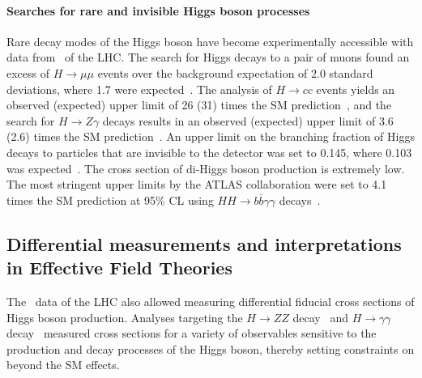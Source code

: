\paragraph{Searches for rare and invisible Higgs boson processes}
Rare decay modes of the Higgs boson have become experimentally accessible with data from \RunTwo\ of the LHC. 
The search for Higgs decays to a pair of muons found an excess of $H \to \mu\mu$ events over the background expectation of 2.0 standard deviations, where 1.7 were expected~\cite{HIGG-2019-14}.
The analysis of $H \to cc$ events yields an observed (expected) upper limit of 26 (31) times the SM prediction~\cite{ATLAS-CONF-2021-021}, and the search for $H \to Z\gamma$ decays results in an observed (expected) upper limit of 3.6 (2.6) times the SM prediction~\cite{HIGG-2018-42}.
An upper limit on the branching fraction of Higgs decays to particles that are invisible to the detector was set to 0.145, where 0.103 was expected~\cite{ATLASInvisible1}.
The cross section of di-Higgs boson production is extremely low. The most stringent upper limits by the ATLAS collaboration were set to 4.1 times the SM prediction at 95\% CL using $HH \to b\bar{b}\gamma\gamma$ decays~\cite{ATLAS-CONF-2021-016}.

\subsection{Differential measurements and interpretations in Effective Field Theories}
The \RunTwo\ data of the LHC also allowed measuring differential fiducial cross sections of Higgs boson production. Analyses targeting the $H \to ZZ$ decay~\cite{ATLAS:2020wny} and $H \to \gamma\gamma$ decay~\cite{https://doi.org/10.48550/arxiv.2202.00487} measured cross sections for a variety of observables sensitive to the production and decay processes of the Higgs boson, thereby setting constraints on beyond the SM effects.

